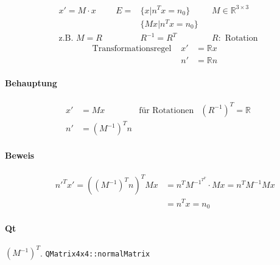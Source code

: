 \begin{align*}
	x' = M\cdot x && E = & \{ x | n^T x = n_0 \} && M\in \mathbb{R}^{3\times 3}\\
	              &&     & \{ Mx | n^T x = n_0 \} && \\
	\text{z.B. } M = R && & R^{-1} = R^T && R: \text{ Rotation}
\end{align*}
\begin{align*}
	&\text{Transformationsregel }&x' &=\mathbb{R}x &&\\
	&&n' &=\mathbb{R}n &&  
\end{align*}
\paragraph{Behauptung}
\begin{align*}
	x'&=Mx	&\text{für Rotationen} & \left( R^{-1} \right)^T = \mathbb{R}\\
	n'&=\left( M^{-1} \right)^Tn   &&
\end{align*}
\paragraph{Beweis}
\begin{align*}
	&& n'^Tx' = \left( \left( M^{-1} \right)^T n \right)^T Mx &= n^T M^{-1^{T^T}}\cdot Mx = n^TM^{-1}Mx\\
	&&&=n^Tx = n_0
\end{align*}
\paragraph{Qt}
$\left( M^{-1} \right)^T$. \texttt{QMatrix4x4::normalMatrix}


